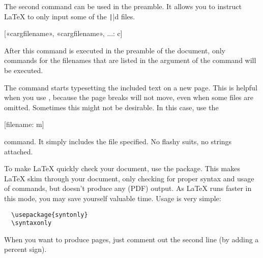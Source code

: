 The second command can be used in the preamble. It allows you to
instruct \LaTeX{} to only input some of the \texttt||d %
files.
\begin{lscommand}
  [{{«\bs carg{filename}», «\bs carg{filename}», ...}}: c]
\end{lscommand}
After this command is executed in the preamble of the document, only
 commands for the filenames that are listed in the
argument of the  command will be executed.

The  command starts typesetting the included text on a new
page. This is helpful when you use , because the
page breaks will not move, even when some  files are omitted.
Sometimes this might not be desirable. In this case, use the
\begin{lscommand}
  [filename: m]
\end{lscommand}
command. It simply includes the file specified.
No flashy suits, no strings attached.

To make \LaTeX{} quickly check your document, use the 
package. This makes \LaTeX{} skim through your document, only checking for
proper syntax and usage of commands, but doesn't produce any (PDF) output.
As \LaTeX{} runs faster in this mode, you may save yourself valuable time.
Usage is very simple:

\begin{verbatim}
  \usepackage{syntonly}
  \syntaxonly
\end{verbatim}
When you want to produce pages, just comment out the second line
(by adding a percent sign).
